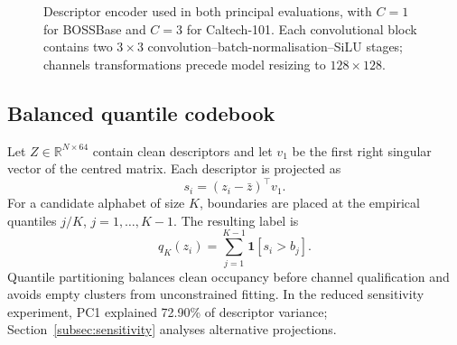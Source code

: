 ﻿\documentclass[10pt,journal]{IEEEtran}
\begin{document}
\begin{figure}[t]
\centering
{}
\caption{Descriptor encoder used in both principal evaluations, with $C{=}1$
for BOSSBase and $C{=}3$ for Caltech-101. Each convolutional block contains
two $3\times3$ convolution--batch-normalisation--SiLU stages; channels
transformations precede model resizing to $128\times128$.}
\label{fig:encoder}
\end{figure}

\subsection{Balanced quantile codebook}

Let $Z\in\mathbb{R}^{N\times64}$ contain clean descriptors and let
$v_1$ be the first right singular vector of the centred matrix. Each
descriptor is projected as
\begin{equation}
s_i=(z_i-\bar z)^\top v_1.
\end{equation}
For a candidate alphabet of size $K$, boundaries are placed at the
empirical quantiles $j/K$, $j=1,\ldots,K-1$. The resulting label is
\begin{equation}
q_K(z_i)=\sum_{j=1}^{K-1}\mathbf{1}[s_i>b_j].
\label{eq:quantile}
\end{equation}
Quantile partitioning balances clean occupancy before channel
qualification and avoids empty clusters from unconstrained fitting.
In the reduced sensitivity experiment, PC1 explained 72.90\% of
descriptor variance; Section~\ref{subsec:sensitivity} analyses
alternative projections.
\end{document}
